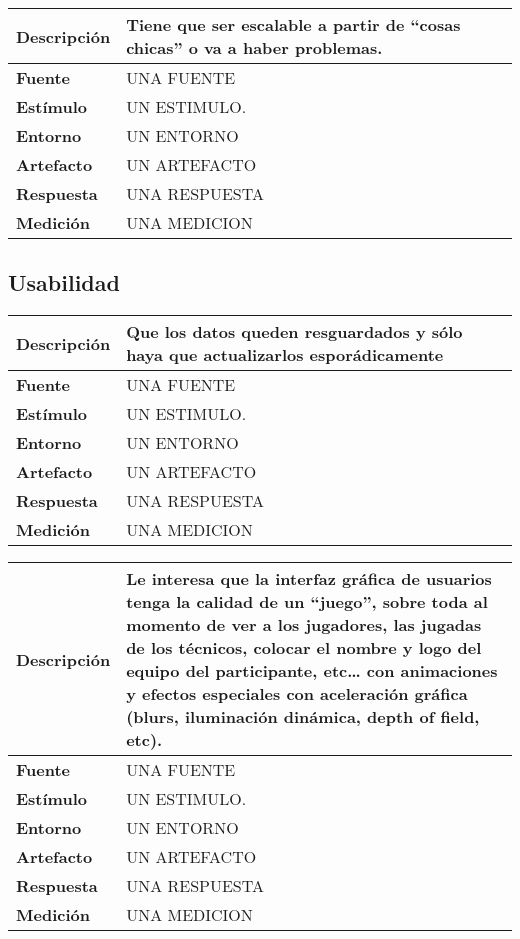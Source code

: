 \begin{center}
  \begin{tabular}{| l | p{10cm} | }
    \hline
  \textbf{Descripción} & Tiene que ser escalable a partir de “cosas chicas” o va a haber problemas. \\  \hline
  \textbf{Fuente} & UNA FUENTE\\  \hline
  \textbf{Estímulo} & UN ESTIMULO.\\  \hline
  \textbf{Entorno} & UN ENTORNO\\  \hline
  \textbf{Artefacto} & UN ARTEFACTO\\  \hline
  \textbf{Respuesta} & UNA RESPUESTA\\  \hline
  \textbf{Medición} & UNA MEDICION\\  \hline
  \end{tabular}
\end{center} 


\subsection{Usabilidad}

\begin{center}
  \begin{tabular}{| l | p{10cm} | }
    \hline
  \textbf{Descripción} & Que los datos queden resguardados y sólo haya que actualizarlos esporádicamente\\  \hline
  \textbf{Fuente} & UNA FUENTE\\  \hline
  \textbf{Estímulo} & UN ESTIMULO.\\  \hline
  \textbf{Entorno} & UN ENTORNO\\  \hline
  \textbf{Artefacto} & UN ARTEFACTO\\  \hline
  \textbf{Respuesta} & UNA RESPUESTA\\  \hline
  \textbf{Medición} & UNA MEDICION\\  \hline
  \end{tabular}
\end{center} 

\begin{center}
  \begin{tabular}{| l | p{10cm} | }
    \hline
  \textbf{Descripción} & Le interesa que la interfaz gráfica de usuarios tenga la calidad de un “juego”, sobre toda al momento de ver a los jugadores, las jugadas de los técnicos, colocar el nombre y logo del equipo del participante, etc… con animaciones y efectos especiales con aceleración gráfica (blurs, iluminación dinámica, depth of field, etc). \\  \hline
  \textbf{Fuente} & UNA FUENTE\\  \hline
  \textbf{Estímulo} & UN ESTIMULO.\\  \hline
  \textbf{Entorno} & UN ENTORNO\\  \hline
  \textbf{Artefacto} & UN ARTEFACTO\\  \hline
  \textbf{Respuesta} & UNA RESPUESTA\\  \hline
  \textbf{Medición} & UNA MEDICION\\  \hline
  \end{tabular}
\end{center} 

